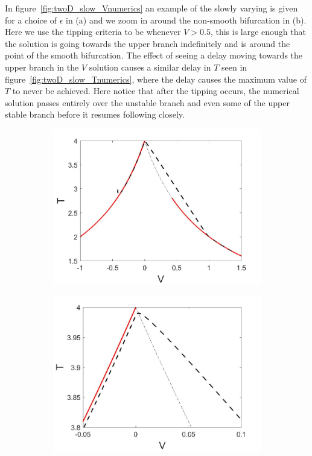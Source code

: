 In figure~\ref{fig:twoD_slow_Vnumerics} an example of the slowly varying is given for a choice of $\epsilon$ in (a) and we zoom in around the non-smooth bifurcation in (b). Here we use the tipping criteria to be whenever $V>0.5$, this is large enough that the solution is going towards the upper branch indefinitely and is around the point of the smooth bifurcation. The effect of seeing a delay moving towards the upper branch in the $V$ solution causes a similar delay in $T$ seen in figure~\ref{fig:twoD_slow_Tnumerics}, where the delay causes the maximum value of $T$ to never be achieved. Here notice that after the tipping occurs, the numerical solution passes entirely over the unstable branch and even some of the upper stable branch before it resumes following closely.

\begin{figure}[H]
\centering
\begin{subfigure}{.5\textwidth}
  \centering
  \includegraphics[width=\linewidth]{twoD/slow_bif_Tplot.jpg}
  \caption{}
\end{subfigure}%
\begin{subfigure}{.5\textwidth}
  \centering
  \includegraphics[width=\linewidth]{twoD/slow_bif_Tplot_zoom.jpg}

\end{subfigure}
\end{figure}
